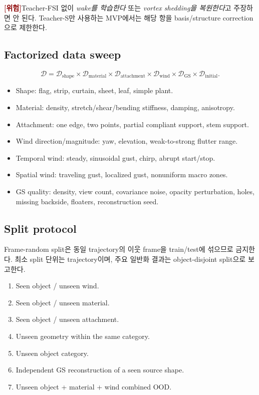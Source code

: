 \documentclass[11pt,a4paper]{article}
\newcommand{\risk}{\textcolor{darkred}{\textbf{[위험]}}}
\begin{document}
\risk Teacher-FSI 없이 \emph{wake를 학습한다} 또는
\emph{vortex shedding을 복원한다}고 주장하면 안 된다.
Teacher-S만 사용하는 MVP에서는 해당 항을 basis/structure correction으로 제한한다.

\subsection{Factorized data sweep}

\begin{equation}
  \mathcal D
  =
  \mathcal D_{\mathrm{shape}}
  \times\mathcal D_{\mathrm{material}}
  \times\mathcal D_{\mathrm{attachment}}
  \times\mathcal D_{\mathrm{wind}}
  \times\mathcal D_{\mathrm{GS}}
  \times\mathcal D_{\mathrm{initial}}.
\end{equation}

\begin{itemize}[leftmargin=1.5em]
  \item Shape: flag, strip, curtain, sheet, leaf, simple plant.
  \item Material: density, stretch/shear/bending stiffness, damping, anisotropy.
  \item Attachment: one edge, two points, partial compliant support, stem support.
  \item Wind direction/magnitude: yaw, elevation, weak-to-strong flutter range.
  \item Temporal wind: steady, sinusoidal gust, chirp, abrupt start/stop.
  \item Spatial wind: traveling gust, localized gust, nonuniform macro zones.
  \item GS quality: density, view count, covariance noise, opacity perturbation,
  holes, missing backside, floaters, reconstruction seed.
\end{itemize}

\subsection{Split protocol}

Frame-random split은 동일 trajectory의 이웃 frame을 train/test에 섞으므로 금지한다.
최소 split 단위는 trajectory이며, 주요 일반화 결과는 object-disjoint split으로 보고한다.

\begin{enumerate}[leftmargin=1.7em]
  \item Seen object / unseen wind.
  \item Seen object / unseen material.
  \item Seen object / unseen attachment.
  \item Unseen geometry within the same category.
  \item Unseen object category.
  \item Independent GS reconstruction of a seen source shape.
  \item Unseen object + material + wind combined OOD.
\end{enumerate}
\end{document}
